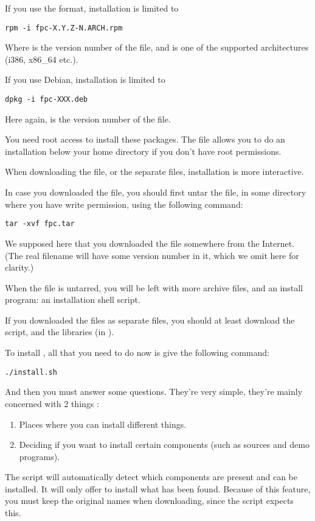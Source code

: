 If you use the  format, installation is limited to
\begin{verbatim}
rpm -i fpc-X.Y.Z-N.ARCH.rpm
\end{verbatim}
Where  is the version number of the  file, 
and  is one of the supported architectures (i386, x86\_64 etc.).

If you use Debian, installation is limited to
\begin{verbatim}
dpkg -i fpc-XXX.deb
\end{verbatim}
Here again,  is the version number of the  file.

You need root access to install these packages. The  file
allows you to do an installation below your home directory if you 
don't have root permissions.

When downloading the  file, or the separate files,
installation is more interactive.

In case you downloaded the  file, you should first untar
the file, in some directory where
you have write permission, using the following command:
\begin{verbatim}
tar -xvf fpc.tar
\end{verbatim}
We supposed here that you downloaded the file  somewhere
from the Internet. (The real filename will have some version number in it,
which we omit here for clarity.)

When the file is untarred, you will be left with more archive files, and
an install program: an installation shell script.

If you downloaded the files as separate files, you should at least download
the  script, and the libraries (in ).

To install \fpc, all that you need to do now is give the following command:
\begin{verbatim}
./install.sh
\end{verbatim}
And then you must answer some questions. They're very simple, they're
mainly concerned with 2 things :
\begin{enumerate}
\item Places where you can install different things.
\item Deciding if you want to install certain components (such as sources
and demo programs).
\end{enumerate}
The script will automatically detect which components are present and can be
installed. It will only offer to install what has been found.
Because of this feature, you must keep the original names when downloading,
since the script expects this.

